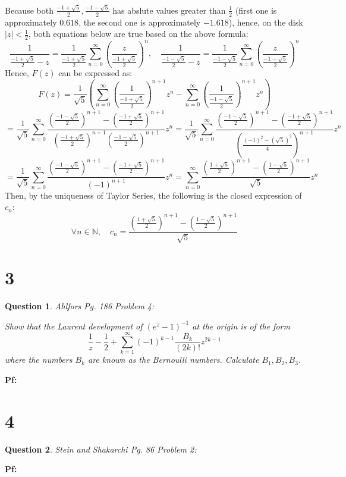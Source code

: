 \documentclass{article}
\newtheorem{question}{Question}
\begin{document}
Because both $\frac{-1+\sqrt{5}}{2},\frac{-1-\sqrt{5}}{2}$ has abslute values greater than $\frac{1}{2}$ (first one is approximately $0.618$, the second one is approximately $-1.618$),
hence, on the disk $|z|<\frac{1}{2}$, both equations below are true based on the above formula:
$$\frac{1}{\frac{-1+\sqrt{5}}{2}-z}=\frac{1}{\frac{-1+\sqrt{5}}{2}}\sum_{n=0}^{\infty}\left(\frac{z}{\frac{-1+\sqrt{5}}{2}}\right)^n,\quad \frac{1}{\frac{-1-\sqrt{5}}{2}-z}=\frac{1}{\frac{-1-\sqrt{5}}{2}}\sum_{n=0}^{\infty}\left(\frac{z}{\frac{-1-\sqrt{5}}{2}}\right)^n$$
Hence, $F(z)$ can be expressed as:
$$F(z)=\frac{1}{\sqrt{5}}\left(\sum_{n=0}^{\infty}\left(\frac{1}{\frac{-1+\sqrt{5}}{2}}\right)^{n+1}z^n-\sum_{n=0}^{\infty}\left(\frac{1}{\frac{-1-\sqrt{5}}{2}}\right)^{n+1}z^n\right)$$
$$=\frac{1}{\sqrt{5}}\sum_{n=0}^{\infty}\frac{\left(\frac{-1-\sqrt{5}}{2}\right)^{n+1}-\left(\frac{-1+\sqrt{5}}{2}\right)^{n+1}}{\left(\frac{-1+\sqrt{5}}{2}\right)^{n+1}\left(\frac{-1-\sqrt{5}}{2}\right)^{n+1}}z^n =\frac{1}{\sqrt{5}}\sum_{n=0}^{\infty}\frac{\left(\frac{-1-\sqrt{5}}{2}\right)^{n+1}-\left(\frac{-1+\sqrt{5}}{2}\right)^{n+1}}{\left(\frac{(-1)^2-(\sqrt{5})^2}{4}\right)^{n+1}}z^n$$
$$=\frac{1}{\sqrt{5}}\sum_{n=0}^{\infty}\frac{\left(\frac{-1-\sqrt{5}}{2}\right)^{n+1}-\left(\frac{-1+\sqrt{5}}{2}\right)^{n+1}}{(-1)^{n+1}}z^n = \sum_{n=0}^{\infty}\frac{\left(\frac{1+\sqrt{5}}{2}\right)^{n+1}-\left(\frac{1-\sqrt{5}}{2}\right)^{n+1}}{\sqrt{5}}z^n$$
Then, by the uniqueness of Taylor Series, the following is the closed expression of $c_n$:
$$\forall n\in\mathbb{N},\quad c_n=\frac{\left(\frac{1+\sqrt{5}}{2}\right)^{n+1}-\left(\frac{1-\sqrt{5}}{2}\right)^{n+1}}{\sqrt{5}}$$

\break

\section*{3}
\begin{myBox}[]{}
    \begin{question}
        Ahlfors Pg. 186 Problem 4:

        Show that the Laurent development of $(e^z-1)^{-1}$ at the origin is of the form
        $$\frac{1}{z}-\frac{1}{2}+\sum_{k=1}^{\infty}(-1)^{k-1}\frac{B_k}{(2k)!}z^{2k-1}$$
        where the numbers $B_k$ are known as the Bernoulli numbers. Calculate $B_1,B_2,B_3$.
    \end{question}
\end{myBox}

\textbf{Pf:}

\break

\section*{4}
\begin{myBox}[]{}
    \begin{question}
        Stein and Shakarchi Pg. 86 Problem 2:
    \end{question}
\end{myBox}

\textbf{Pf:}
\end{document}
